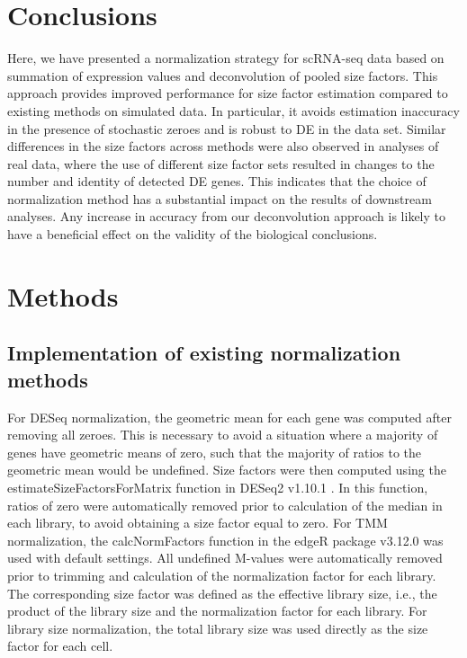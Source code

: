 \documentclass{bmcart}
\newcommand{\revised}[1]{#1}
\begin{document}
\section*{Conclusions}
Here, we have presented a normalization strategy for scRNA-seq data based on summation of expression values and deconvolution of pooled size factors.
This approach provides improved performance for size factor estimation compared to existing methods on simulated data.
In particular, it avoids estimation inaccuracy in the presence of stochastic zeroes and is robust to DE in the data set.
Similar differences in the size factors across methods were also observed in analyses of real data,
    where the use of different size factor sets resulted in changes to the number and identity of detected DE genes.
This indicates that the choice of normalization method has a substantial impact on the results of downstream analyses.
Any increase in accuracy from our deconvolution approach is likely to have a beneficial effect on the validity of the biological conclusions.

\section*{Methods}

\subsection*{Implementation of existing normalization methods}
For DESeq normalization, the geometric mean for each gene was computed after removing all zeroes.
This is necessary to avoid a situation where a majority of genes have geometric means of zero, such that the majority of ratios to the geometric mean would be undefined.
Size factors were then computed using the estimateSizeFactorsForMatrix function in DESeq2 v1.10.1 \cite{love2014moderated}.
\revised{In this function, ratios of zero were automatically removed prior to calculation of the median in each library, to avoid obtaining a size factor equal to zero.}
For TMM normalization, the calcNormFactors function in the edgeR package v3.12.0 \cite{robinson2010edgeR} was used with default settings.
All undefined M-values were automatically removed prior to trimming and calculation of the normalization factor for each library.
The corresponding size factor was defined as the effective library size, i.e., the product of the library size and the normalization factor for each library.
For library size normalization, the total library size was used directly as the size factor for each cell.
\end{document}
